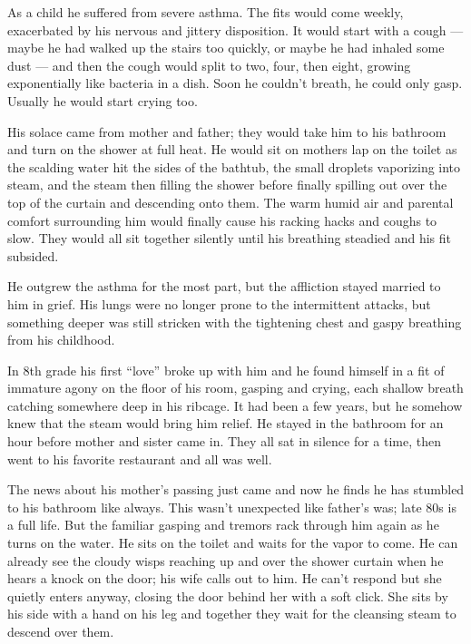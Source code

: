 \indent As a child he suffered from severe asthma. The fits would come weekly, exacerbated by his nervous and jittery disposition. It would start with a cough --- maybe he had walked up the stairs too quickly, or maybe he had inhaled some dust --- and then the cough would split to two, four, then eight, growing exponentially like bacteria in a dish. Soon he couldn't breath, he could only gasp. Usually he would start crying too.
 
His solace came from mother and father; they would take him to his bathroom and turn on the shower at full heat. He would sit on mothers lap on the toilet as the scalding water hit the sides of the bathtub, the small droplets vaporizing into steam, and the steam then filling the shower before finally spilling out over the top of the curtain and descending onto them. The warm humid air and parental comfort surrounding him would finally cause his racking hacks and coughs to slow. They would all sit together silently until his breathing steadied and his fit subsided.
	
He outgrew the asthma for the most part, but the affliction stayed married to him in grief. His lungs were no longer prone to the intermittent attacks, but something deeper was still stricken with the tightening chest and gaspy breathing from his childhood.
	
In 8th grade his first “love” broke up with him and he found himself in a fit of immature agony on the floor of his room, gasping and crying, each shallow breath catching somewhere deep in his ribcage. It had been a few years, but he somehow knew that the steam would bring him relief. He stayed in the bathroom for an hour before mother and sister came in. They all sat in silence for a time, then went to his favorite restaurant and all was well.

The news about his mother’s passing just came and now he finds he has stumbled to his bathroom like always. This wasn’t unexpected like father’s was; late 80s is a full life. But the familiar gasping and tremors rack through him again as he turns on the water. He sits on the toilet and waits for the vapor to come. He can already see the cloudy wisps reaching up and over the shower curtain when he hears a knock on the door; his wife calls out to him. He can’t respond but she quietly enters anyway, closing the door behind her with a soft click. She sits by his side with a hand on his leg and together they wait for the cleansing steam to descend over them.
